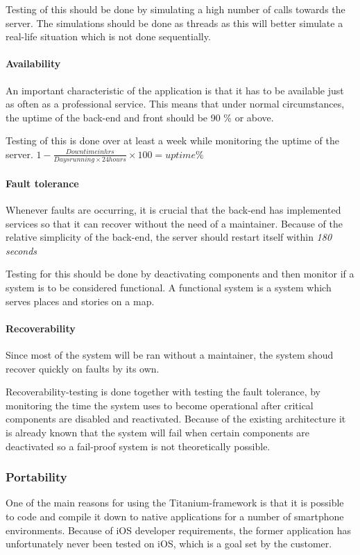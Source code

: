 Testing of this should be done by simulating a high number of calls towards the server. The simulations should be done as threads as this will better simulate a real-life situation which is not done sequentially.

\paragraph{Availability}
An important characteristic of the application is that it has to be available just as often as a professional service. This means that under normal circumstances, the uptime of the back-end and front should be 90 \% or above.

Testing of this is done over at least a week while monitoring the uptime of the server. $1-\frac{Downtime in hrs}{Days running \times 24 hours} \times 100 = uptime \% $

\paragraph{Fault tolerance}
Whenever faults are occurring, it is crucial that the back-end has implemented services so that it can recover without the need of a maintainer. Because of the relative simplicity of the back-end, the server should restart itself within \textit{180 seconds}

Testing for this should be done by deactivating components and then monitor if a system is to be considered functional. A functional system is a system which serves places and stories on a map.

\paragraph{Recoverability}
Since most of the system will be ran without a maintainer, the system shoud recover quickly on faults by its own.

Recoverability-testing is done together with testing the fault tolerance, by monitoring the time the system uses to become operational after critical components are disabled and reactivated. Because of the existing architecture it is already known that the system will fail when certain components are deactivated so a fail-proof system is not theoretically possible.

\subsubsection{Portability}
One of the main reasons for using the Titanium-framework is that it is possible to code and compile it down to native applications for a number of smartphone environments. Because of iOS developer requirements, the former application has unfortunately never been tested on iOS, which is a goal set by the customer.

